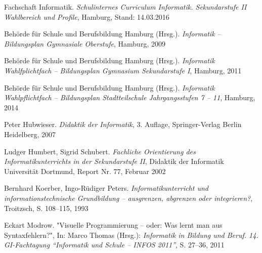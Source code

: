 \begin{thebibliography}{ABCDEF}
Fachschaft Informatik. \emph{Schulinternes Curriculum Informatik. Sekundarstufe II Wahlbereich und Profile}, Hamburg, Stand: 14.03.2016


Behörde für Schule und Berufsbildung Hamburg (Hrsg.). \emph{Informatik -- Bildungsplan  Gymnasiale Oberstufe}, Hamburg, 2009

Behörde für Schule und Berufsbildung Hamburg (Hrsg.). \emph{Informatik Wahlfplichtfach -- Bildungsplan Gymnasium Sekundarstufe I}, Hamburg, 2011

Behörde für Schule und Berufsbildung Hamburg (Hrsg.). \emph{Informatik Wahlpflichtfach -- Bildungsplan Stadtteilschule Jahrgangsstufen 7 -- 11}, Hamburg, 2014

Peter Hubwieser. \emph{Didaktik der Informatik}, 3. Auflage, Springer-Verlag Berlin Heidelberg, 2007

Ludger Humbert, Sigrid Schubert. \emph{Fachliche Orientierung des Informatikunterrichts in der Sekundarstufe II}, Didaktik der Informatik Universität Dortmund, Report Nr. 77, Februar 2002

Bernhard Koerber, Ingo-Rüdiger Peters. \emph{Informatikunterricht und informationstechnische Grundbildung –
ausgrenzen, abgrenzen oder integrieren?}, Troitzsch, S. 108--115, 1993 

Eckart Modrow. "{Visuelle Programmierung -- oder: Was lernt man aus Syntaxfehlern?}", In: Marco Thomas (Hrsg.): \emph{Informatik in Bildung und Beruf. 14. GI-Fachtagung "`Informatik und Schule – INFOS 2011"'}, S. 27--36, 2011

%





\end{thebibliography}
